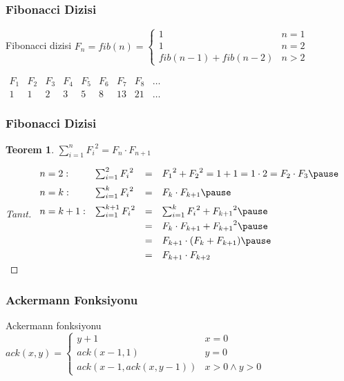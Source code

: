 \documentclass[dvipsnames]{beamer}
\theoremstyle{definition}
\theoremstyle{example}
\theoremstyle{plain}
\newtheorem{teorem}[theorem]{Teorem}
\begin{document}
\begin{frame}
  \frametitle{Fibonacci Dizisi}

  \begin{block}{Fibonacci dizisi}
    $F_n = fib(n) = \left\{
      \begin{array}{ll}
        1                   & n = 1\\
        1                   & n = 2\\
        fib(n-1) + fib(n-2) & n > 2
      \end{array}
    \right.$
  \end{block}

  \pause
  \bigskip
  $\begin{array}{ccccccccc}
     F_1 & F_2 & F_3 & F_4 & F_5 & F_6 & F_7 & F_8 & \dots\\
     1   & 1   & 2   & 3   & 5   & 8   & 13  & 21  & \dots
  \end{array}$
\end{frame}

\begin{frame}
  \frametitle{Fibonacci Dizisi}

  \begin{teorem}
    $\sum_{i=1}^{n} {F_i}^2 = F_n \cdot F_{n+1}$
  \end{teorem}

  \pause
  \begin{proof}[Tanıt]
    $\begin{array}{llcl}
      n=2:   & \sum_{i=1}^{2} {F_i}^2   & = & {F_1}^2+{F_2}^2=1+1=1 \cdot 2=F_2 \cdot F_3
      \pause
      \medskip\\
      n=k:   & \sum_{i=1}^{k} {F_i}^2   & = & F_k \cdot F_{k+1}
      \pause
      \medskip\\
      n=k+1: & \sum_{i=1}^{k+1} {F_i}^2 & = & \sum_{i=1}^{k} {F_i}^2 + {F_{k+1}}^2
      \pause
      \smallskip\\
             &                          & = & F_k \cdot F_{k+1} + {F_{k+1}}^2
      \pause
      \smallskip\\
             &                          & = & F_{k+1} \cdot (F_k + F_{k+1})
      \pause
      \smallskip\\
             &                          & = & F_{k+1} \cdot F_{k+2}
    \end{array}$
  \end{proof}
\end{frame}

\begin{frame}
  \frametitle{Ackermann Fonksiyonu}

  \begin{block}{Ackermann fonksiyonu}
    $ack(x,y) = \left\{
      \begin{array}{ll}
        y+1                 & x = 0\\
        ack(x-1, 1)         & y = 0\\
        ack(x-1,ack(x,y-1)) & x > 0 \wedge y > 0
      \end{array}
    \right.$
  \end{block}
\end{frame}
\end{document}
